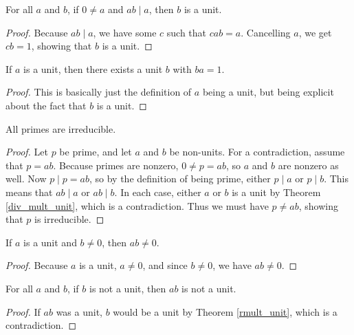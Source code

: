 \documentclass[../../math.tex]{subfiles}
\begin{document}
\begin{theorem} \label{div_mult_unit}
    For all $a$ and $b$, if $0 \neq a$ and $ab \mid a$, then $b$ is a unit.
\end{theorem}
\begin{proof}
    Because $ab \mid a$, we have some $c$ such that $cab = a$.  Cancelling $a$,
    we get $cb = 1$, showing that $b$ is a unit.
\end{proof}

\begin{theorem} \label{unit_ex}
    If $a$ is a unit, then there exists a unit $b$ with $ba = 1$.
\end{theorem}
\begin{proof}
    This is basically just the definition of $a$ being a unit, but being
    explicit about the fact that $b$ is a unit.
\end{proof}

\begin{theorem} \label{prime_irreducible}
    All primes are irreducible.
\end{theorem}
\begin{proof}
    Let $p$ be prime, and let $a$ and $b$ be non-units.  For a contradiction,
    assume that $p = ab$.  Because primes are nonzero, $0 \neq p = ab$, so $a$
    and $b$ are nonzero as well.  Now $p \mid p = ab$, so by the definition of
    being prime, either $p \mid a$ or $p \mid b$.  This means that $ab \mid a$
    or $ab \mid b$.  In each case, either $a$ or $b$ is a unit by Theorem
    \ref{div_mult_unit}, which is a contradiction.  Thus we must have $p \neq
    ab$, showing that $p$ is irreducible.
\end{proof}

\begin{theorem} \label{nz_unit}
    If $a$ is a unit and $b \neq 0$, then $ab \neq 0$.
\end{theorem}
\begin{proof}
    Because $a$ is a unit, $a \neq 0$, and since $b \neq 0$, we have $ab \neq
    0$.
\end{proof}

\begin{theorem} \label{not_unit_mult}
    For all $a$ and $b$, if $b$ is not a unit, then $ab$ is not a unit.
\end{theorem}
\begin{proof}
    If $ab$ was a unit, $b$ would be a unit by Theorem \ref{rmult_unit}, which
    is a contradiction.
\end{proof}
\end{document}
